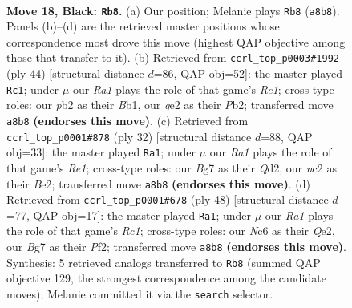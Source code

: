 \documentclass[11pt]{article}
\begin{document}
\clearpage

\begin{figure}[p]\centering
\begin{subfigure}{0.46\textwidth}\centering
\resizebox{\linewidth}{!}{%
\newchessgame
\chessboard[
  setfen={r5k1/pp3pbp/1nn2qp1/3p1b2/3P4/1B5P/PPN1QPP1/RNB3K1 b - - 2 18},
  showmover=false,
  pgfstyle=straightmove, color=movearrow, markmove={a8-b8}
]}
\caption{}
\end{subfigure}\hfill
\begin{subfigure}{0.46\textwidth}\centering
\resizebox{\linewidth}{!}{%
\newchessgame
\chessboard[
  setfen={rb3nk1/1b4p1/pq2p2p/1p6/P1p1N3/4PN1P/1PQ2PP1/1B2R1K1 w - - 1 23},
  showmover=false,
  pgfstyle=straightmove, color=movearrow, markmove={e1-c1}
]}
\caption{}
\end{subfigure}
\\[4pt]
\begin{subfigure}{0.46\textwidth}\centering
\resizebox{\linewidth}{!}{%
\newchessgame
\chessboard[
  setfen={1q2k2r/3nbppp/2b1p3/1pp1p3/4P3/1N1PB2P/1PPQBPP1/4R1K1 w k - 2 17},
  showmover=false,
  pgfstyle=straightmove, color=movearrow, markmove={e1-a1}
]}
\caption{}
\end{subfigure}\hfill
\begin{subfigure}{0.46\textwidth}\centering
\resizebox{\linewidth}{!}{%
\newchessgame
\chessboard[
  setfen={1q1r2k1/1p2bpp1/p3p3/4n1p1/1n2N1P1/2B1P2P/PP2QPB1/2R3K1 w - - 3 25},
  showmover=false,
  pgfstyle=straightmove, color=movearrow, markmove={c1-a1}
]}
\caption{}
\end{subfigure}
\caption{\textbf{Move 18, Black: \texttt{Rb8}.} (a) Our position; Melanie plays \texttt{Rb8} (\texttt{a8b8}). Panels (b)--(d) are the retrieved master positions whose correspondence most drove this move (highest QAP objective among those that transfer to it). (b) Retrieved from \texttt{ccrl\_top\_p0003\#1992} (ply 44) [structural distance $d$=86, QAP obj=52]: the master played \texttt{Rc1}; under $\mu$ our \emph{Ra1} plays the role of that game's \emph{Re1}; cross-type roles: our \emph{p}b2 as their \emph{B}b1, our \emph{q}e2 as their \emph{P}b2; transferred move \texttt{a8b8} \textbf{(endorses this move)}. (c) Retrieved from \texttt{ccrl\_top\_p0001\#878} (ply 32) [structural distance $d$=88, QAP obj=33]: the master played \texttt{Ra1}; under $\mu$ our \emph{Ra1} plays the role of that game's \emph{Re1}; cross-type roles: our \emph{B}g7 as their \emph{Q}d2, our \emph{n}c2 as their \emph{B}e2; transferred move \texttt{a8b8} \textbf{(endorses this move)}. (d) Retrieved from \texttt{ccrl\_top\_p0001\#678} (ply 48) [structural distance $d$=77, QAP obj=17]: the master played \texttt{Ra1}; under $\mu$ our \emph{Ra1} plays the role of that game's \emph{Rc1}; cross-type roles: our \emph{N}c6 as their \emph{Q}e2, our \emph{B}g7 as their \emph{P}f2; transferred move \texttt{a8b8} \textbf{(endorses this move)}. Synthesis: 5 retrieved analogs transferred to \texttt{Rb8} (summed QAP objective 129, the strongest correspondence among the candidate moves); Melanie committed it via the \texttt{search} selector.}
\label{fig:thought-m35}
\end{figure}
\end{document}
